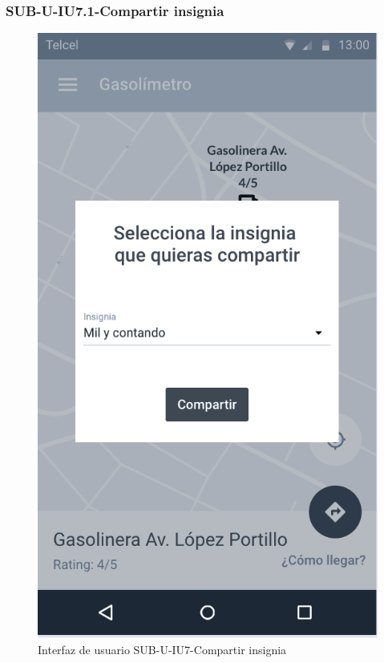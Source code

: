 \subsubsection{SUB-U-IU7.1-Compartir insignia}\label{SUB-U-IU7.1}
\begin{figure}[H]
	\centering
	\includegraphics[scale=.55]{Capitulo4/software/submodulos/usuarios/images/sub-u-iu7_1}
	\caption{Interfaz de usuario SUB-U-IU7-Compartir insignia}
	\label{fig:sub-u-iu7}
\end{figure}